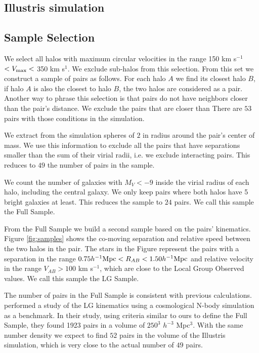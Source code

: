\documentclass{emulateapj}
\newcommand{\hMpc}{{\ifmmode{h^{-1}{\rm Mpc}}\else{$h^{-1}$Mpc}\fi}}
\begin{document}
\subsection{Illustris simulation}

\subsection{Sample Selection}

We select all halos with maximum circular velocities in the
range 150 km s$^{-1}$ $<V_{\rm max}<$ 350 km s$^{1}$.
We exclude sub-halos from this selection.
From this set we construct a sample of pairs as follows.
For each halo $A$ we find its closest halo $B$, if halo $A$ is also
the closest to halo $B$, the two halos are considered as a pair. 
Another way to phrase this selection is that pairs do not have
neighbors closer than the pair's distance.
We exclude the pairs that are closer than
There are $53$ pairs with those conditions in the simulation.

We extract from the simulation spheres of $2$ \hMpc in radius around
the pair's center of mass. 
We use this information to exclude all the pairs that have separations
smaller than the sum  of their virial radii, i.e. we exclude
interacting pairs. 
This reduces to $49$ the number of pairs in the sample.

We count the number of galaxies with $M_V<-9$ inside the virial
radius of each halo, including the central galaxy.
We only keep pairs where both halos have 5 bright galaxies at least. 
This reduces the sample to $24$ pairs. 
We call this sample the Full  Sample.

From the Full Sample we build a second sample based on the pairs' kinematics. 
Figure \ref{fig:samples} shows the co-moving separation and relative
speed between the two halos in the pair.
The stars in the Figure represent the pairs with a separation in the
range $0.75\hMpc <R_{AB}< 1.50\hMpc$ and relative velocity in the
range $V_{AB}>100$ km s$^{-1}$, which are close to the Local Group
Observed values.
We call this sample the LG Sample.

The number of pairs in the Full Sample is consistent with previous
calculations. 
\cite{ForeroRomero2013} performed a study of the LG kinematics using a
cosmological N-body simulation as a benchmark. 
In their study, using criteria similar to ours to define the Full
Sample, they found 1923 pairs in a volume of $250^3$ $h^{-3}$
Mpc$^{3}$. 
With the same number density we expect to find $52$ pairs in the
volume of the Illustris simulation, which is very close to the actual
number of $49$ pairs.
\end{document}
